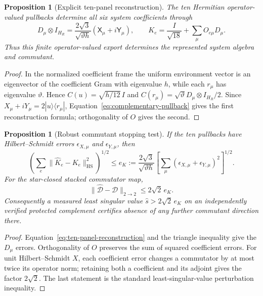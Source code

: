 \documentclass[11pt]{article}
\newtheorem{proposition}[theorem]{Proposition}
\theoremstyle{definition}
\theoremstyle{remark}
\newcommand{\HS}{\mathrm{HS}}
\begin{document}
\begin{proposition}[Explicit ten-panel reconstruction]
\label{prop:ten-panel-reconstruction}
The ten Hermitian operator-valued pullbacks determine all six system
coefficients through
\begin{equation}
 \boxed{
 D_\mu\otimes I_{H_R}
 =\frac{2\sqrt3}{\sqrt{\vartheta h}}
   (\mathsf X_\mu+i\mathsf Y_\mu),
 \qquad
 K_e=\frac{I}{\sqrt{18}}+\sum_\mu O_{e\mu}D_\mu.}
 \label{eq:ten-panel-reconstruction}
\end{equation}
Thus this finite operator-valued export determines the represented system
algebra and commutant.
\end{proposition}

\begin{proof}
In the normalized coefficient frame the uniform environment vector is an
eigenvector of the coefficient Gram with eigenvalue $h$, while each
$r_\mu$ has eigenvalue $\vartheta$.  Hence
$C(u)=\sqrt{h/12}\,I$ and
$C(r_\mu)=\sqrt\vartheta D_\mu\otimes I_{H_R}/2$.
Since $X_\mu+iY_\mu=2|u\rangle\langle r_\mu|$,
Equation~\eqref{eq:complementary-pullback} gives the first reconstruction
formula; orthogonality of $O$ gives the second.
\end{proof}

\begin{proposition}[Robust commutant stopping test]
\label{prop:reconstruction-error}
If the ten pullbacks have Hilbert--Schmidt errors
$\epsilon_{X,\mu}$ and $\epsilon_{Y,\mu}$, then
\begin{equation}
 \left(\sum_e\|\widehat K_e-K_e\|_{\HS}^2\right)^{1/2}
 \le e_K:=\frac{2\sqrt3}{\sqrt{\vartheta h}}
 \left[\sum_\mu(\epsilon_{X,\mu}+\epsilon_{Y,\mu})^2\right]^{1/2}.
 \label{eq:appendix-reconstruction-error}
\end{equation}
For the star-closed stacked commutator map,
\begin{equation}
 \|\widehat{\mathscr D}-\mathscr D\|_{2\to2}\le2\sqrt2\,e_K.
 \label{eq:appendix-commutator-error}
\end{equation}
Consequently a measured least singular value
$\widehat s>2\sqrt2\,e_K$ on an independently verified protected complement
certifies absence of any further commutant direction there.
\end{proposition}

\begin{proof}
Equation~\eqref{eq:ten-panel-reconstruction} and the triangle inequality give
the $D_\mu$ errors.  Orthogonality of $O$ preserves the sum of squared
coefficient errors.  For unit Hilbert--Schmidt $X$, each coefficient error
changes a commutator by at most twice its operator norm; retaining both a
coefficient and its adjoint gives the factor $2\sqrt2$.  The last statement
is the standard least-singular-value perturbation inequality.
\end{proof}
\end{document}

